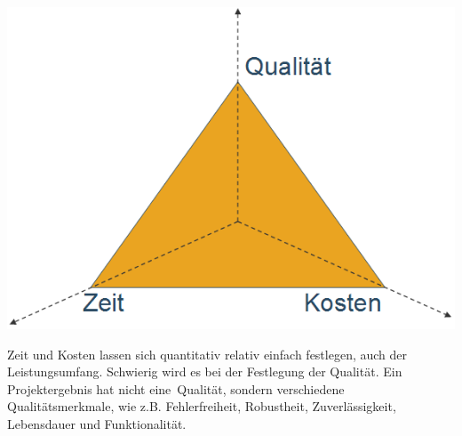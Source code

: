 \includegraphics[scale=0.4]{1jahr_pictures/lf02-pic/lf02-projekt-dreieck.png}

\noindent Zeit und Kosten lassen sich quantitativ relativ einfach festlegen, auch der Leistungsumfang. Schwierig wird es bei der Festlegung der Qualität. Ein Projektergebnis hat nicht \ql eine\qr\ Qualität, sondern verschiedene Qualitätsmerkmale, wie z.B. Fehlerfreiheit, Robustheit, Zuverlässigkeit, Lebensdauer und Funktionalität.

